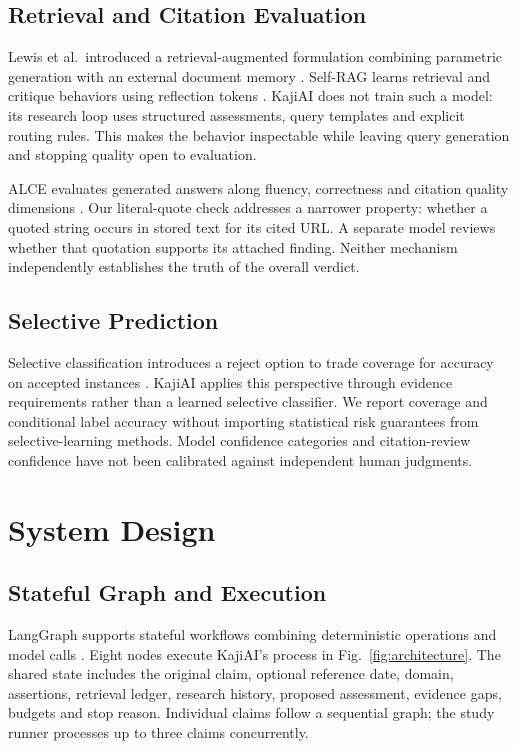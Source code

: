 \documentclass[conference]{IEEEtran}
\begin{document}
\subsection{Retrieval and Citation Evaluation}
Lewis et al.\ introduced a retrieval-augmented formulation combining parametric generation with an external document memory \cite{rag}. Self-RAG learns retrieval and critique behaviors using reflection tokens \cite{selfrag}. KajiAI does not train such a model: its research loop uses structured assessments, query templates and explicit routing rules. This makes the behavior inspectable while leaving query generation and stopping quality open to evaluation.

ALCE evaluates generated answers along fluency, correctness and citation quality dimensions \cite{alce}. Our literal-quote check addresses a narrower property: whether a quoted string occurs in stored text for its cited URL. A separate model reviews whether that quotation supports its attached finding. Neither mechanism independently establishes the truth of the overall verdict.

\subsection{Selective Prediction}
Selective classification introduces a reject option to trade coverage for accuracy on accepted instances \cite{selective}. KajiAI applies this perspective through evidence requirements rather than a learned selective classifier. We report coverage and conditional label accuracy without importing statistical risk guarantees from selective-learning methods. Model confidence categories and citation-review confidence have not been calibrated against independent human judgments.

\section{System Design}
\subsection{Stateful Graph and Execution}
LangGraph supports stateful workflows combining deterministic operations and model calls \cite{langgraph}. Eight nodes execute KajiAI's process in Fig.~\ref{fig:architecture}. The shared state includes the original claim, optional reference date, domain, assertions, retrieval ledger, research history, proposed assessment, evidence gaps, budgets and stop reason. Individual claims follow a sequential graph; the study runner processes up to three claims concurrently.
\end{document}
